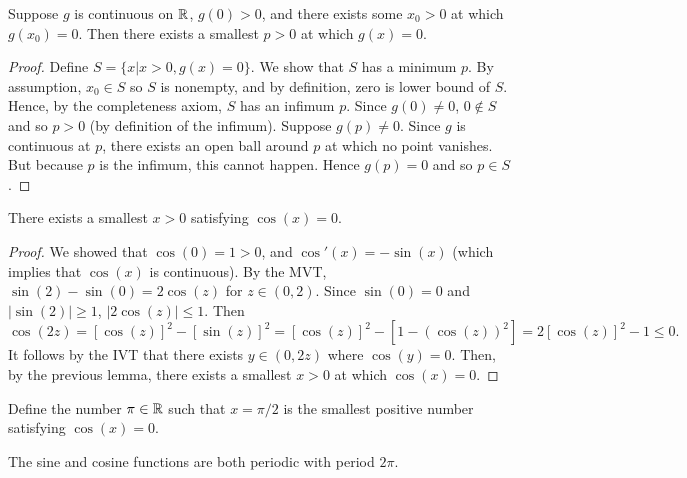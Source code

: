 \documentclass[letterpaper, twoside, 12pt]{book}
\begin{document}
\begin{lemma}
    Suppose \(g\) is continuous on \(\mathbb R\), \(g(0) > 0\), and there
    exists some \(x_0 > 0\) at which \(g(x_0) = 0\). Then there exists
    a smallest \(p > 0\) at which \(g(x) = 0\).
\end{lemma}

\begin{proof}
    Define \(S = \{x | x > 0, g(x) = 0 \}\). We show that \(S\) has
    a minimum \(p\). By assumption, \(x_0 \in S\) so \(S\) is nonempty,
    and by definition, zero is lower bound of \(S\). Hence, by the
    completeness axiom, \(S\) has an infimum \(p\). Since \(g(0) \neq 0\),
    \(0 \not\in S\) and so \(p > 0\) (by definition of the infimum). Suppose
    \(g(p) \neq 0\). Since \(g\) is continuous at \(p\), there exists an
    open ball around \(p\) at which no point vanishes. But because \(p\)
    is the infimum, this cannot happen. Hence \(g(p) = 0\) and so \(p \in S\).
\end{proof}


\begin{theorem}[5.7]
  There exists a smallest \(x>0\) satisfying \(\cos(x)=0\).
\end{theorem}

\begin{proof}
    We showed that \(\cos(0) = 1 > 0\), and
    \(\cos'(x) = -\sin(x)\) (which implies that \(\cos(x)\) is continuous).
    By the MVT, \( \sin(2) - \sin(0) = 2 \cos(z) \) for \(z \in (0, 2)\).
    Since \(\sin(0) = 0\) and \(|\sin(2)| \geq 1\), \(|2\cos(z)| \leq 1\).
    Then
    \[ \cos(2z) = [\cos(z)]^2 - [\sin(z)]^2 = [\cos(z)]^2 - [1 - (\cos(z))^2] = 2[\cos(z)]^2 - 1 \leq 0 .\]
    It follows by the IVT that there exists \(y \in (0, 2z)\) where \(\cos(y) = 0\).
    Then, by the previous lemma, there exists a smallest \(x > 0\) at which
    \(\cos(x) = 0\).
\end{proof}

\begin{definition}
  Define the number \(\pi\in\mathbb R\) such that \(x=\pi/2\) is the
  smallest positive number satisfying \(\cos(x)=0\).
\end{definition}

\begin{theorem}[5.8]
  The sine and cosine functions are both periodic with period \(2\pi\).
\end{theorem}
\end{document}
